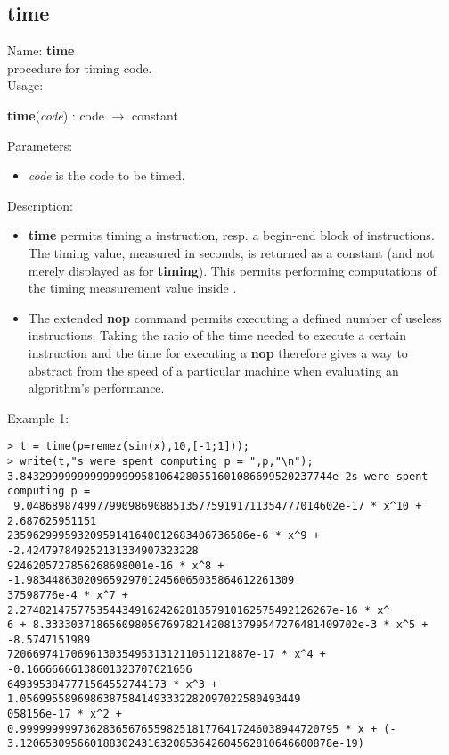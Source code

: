 \subsection{time}
\label{labtime}
\noindent Name: \textbf{time}\\
\phantom{aaa}procedure for timing \sollya code.\\[0.2cm]
\noindent Usage: 
\begin{center}
\textbf{time}(\emph{code}) : \textsf{code} $\rightarrow$ \textsf{constant}\\
\end{center}
Parameters: 
\begin{itemize}
\item \emph{code} is the code to be timed.
\end{itemize}
\noindent Description: \begin{itemize}

\item \textbf{time} permits timing a \sollya instruction, resp. a begin-end block
   of \sollya instructions. The timing value, measured in seconds, is returned
   as a \sollya constant (and not merely displayed as for \textbf{timing}). This 
   permits performing computations of the timing measurement value inside \sollya.

\item The extended \textbf{nop} command permits executing a defined number of
   useless instructions. Taking the ratio of the time needed to execute a
   certain \sollya instruction and the time for executing a \textbf{nop}
   therefore gives a way to abstract from the speed of a particular 
   machine when evaluating an algorithm's performance.
\end{itemize}
\noindent Example 1: 
\begin{center}\begin{minipage}{15cm}\begin{Verbatim}[frame=single]
> t = time(p=remez(sin(x),10,[-1;1]));
> write(t,"s were spent computing p = ",p,"\n");
3.8432999999999999999581064280551601086699520237744e-2s were spent computing p =
 9.0486898749977990986908851357759191711354777014602e-17 * x^10 + 2.687625951151
23596299959320959141640012683406736586e-6 * x^9 + -2.424797849252131334907323228
9246205727856268698001e-16 * x^8 + -1.983448630209659297012456065035864612261309
37598776e-4 * x^7 + 2.2748214757753544349162426281857910162575492126267e-16 * x^
6 + 8.3333037186560980567697821420813799547276481409702e-3 * x^5 + -8.5747151989
72066974170696130354953131211051121887e-17 * x^4 + -0.16666666138601323707621656
6493953847771564552744173 * x^3 + 1.05699558969863875841493332282097022580493449
058156e-17 * x^2 + 0.99999999973628365676559825181776417246038944720795 * x + (-
3.1206530956601883024316320853642604562810646600878e-19)
\end{Verbatim}
\end{minipage}\end{center}
